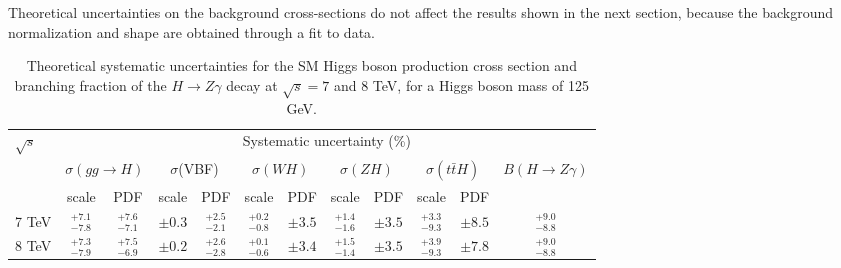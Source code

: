 Theoretical uncertainties on the background cross-sections do not affect the
results shown in the next section, because the background normalization and shape
are obtained through a fit to data.

\begin{table}[!htbp] 
  \renewcommand{\arraystretch}{1.3}
  \begin{center}
    \caption{Theoretical systematic uncertainties for the SM Higgs
      boson production cross section and branching fraction of the
      $H\to Z\gamma$ decay at $\sqrt{s} = 7$ and 8 TeV,
      for a Higgs boson mass of 125 GeV.}
    \label{tab:theory_uncertainties}
    \begin{tabular}{l|cc|cc|cc|cc|cc|c}
      \hline\hline
$\sqrt{s}$ & \multicolumn{11}{c}{Systematic uncertainty (\%)}\\
           & \multicolumn{2}{c}{$\sigma(gg\to H)$} & \multicolumn{2}{|c}{$\sigma$(VBF)} & \multicolumn{2}{|c}{$\sigma(WH)$} & \multicolumn{2}{|c}{$\sigma(ZH)$} & \multicolumn{2}{|c|}{$\sigma(t\bar tH)$} & $B(H\to Z\gamma)$ \\
         & scale & PDF & scale & PDF & scale & PDF & scale & PDF & scale & PDF & \\
\hline
7 TeV & $^{+7.1}_{-7.8}$  & $^{+7.6}_{-7.1}$  & {\small $\pm 0.3$} & $^{+2.5}_{-2.1}$ & $^{+0.2}_{-0.8}$ & {\small $\pm 3.5$} & $^{+1.4}_{-1.6}$ & {\small $\pm 3.5$} & $^{+3.3}_{-9.3}$  & {\small $\pm 8.5$} & $^{+9.0}_{-8.8}$ \\
8 TeV &$^{+7.3}_{-7.9}$  &$^{+7.5}_{-6.9}$   & {\small $\pm 0.2$} & $^{+2.6}_{-2.8}$ & $^{+0.1}_{-0.6}$ & {\small $\pm 3.4$} & $^{+1.5}_{-1.4}$ & {\small $\pm 3.5$} & $^{+3.9}_{-9.3}$  & {\small $\pm 7.8$} & $^{+9.0}_{-8.8}$ \\
  \hline\hline
    \end{tabular}
  \end{center}
\end{table}

